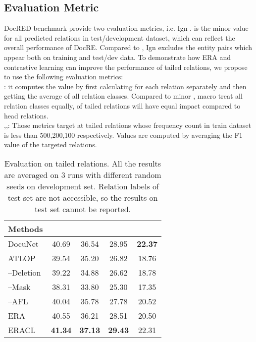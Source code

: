 \documentclass[11pt]{article}
\begin{document}
\subsection{Evaluation Metric}
    DocRED benchmark provide two evaluation metrics, i.e.  Ign .  is the minor  value for all predicted relations in test/development dataset, which can reflect the overall performance of DocRE. Compared to , Ign  excludes the entity pairs which appear both on training and test/dev data.
    To demonstrate how ERA and contrastive learning can improve the performance of tailed relations, we propose to use the following evaluation metrics: \\
    : it computes the  value by first calculating  for each relation separately and then getting the average of all relation classes. Compared to minor , macro  treat all relation classes equally,  of tailed relations will have equal impact compared to head relations.\\
    ,,: Those metrics target at tailed relations whose frequency count in train dataset is less than 500,200,100 respectively. Values are computed by averaging the F1 value of the targeted relations.

\begin{table*}[h]
\centering
    \begin{tabular}{lcccc}
    \toprule
    Methods &  &  &  &   \\
    \midrule
    DocuNet &40.69 & 36.54 & 28.95 & \bf{22.37}          \\
    ATLOP   & 39.54 & 35.20 & 26.82 & 18.76         \\
    \hline
    --Deletion &39.22 &34.88 &26.62 &18.78 \\
    --Mask &38.31 &33.80 &25.30 &17.35 \\
    --AFL &40.04 &35.78 &27.78 &20.52 \\
    \hline
    ERA     & 40.55 & 36.21 & 28.51 & 20.50 \\
    ERACL   & \bf{41.34} & \bf{37.13} & \bf{29.43} & 22.31     \\
    \toprule
\end{tabular}
    \caption{Evaluation on tailed relations. All the results are averaged on 3 runs with different random seeds on development set. Relation labels of test set are not accessible, so the results on test set cannot be reported.}
    \label{tb:tail-results}
\end{table*}
\end{document}
